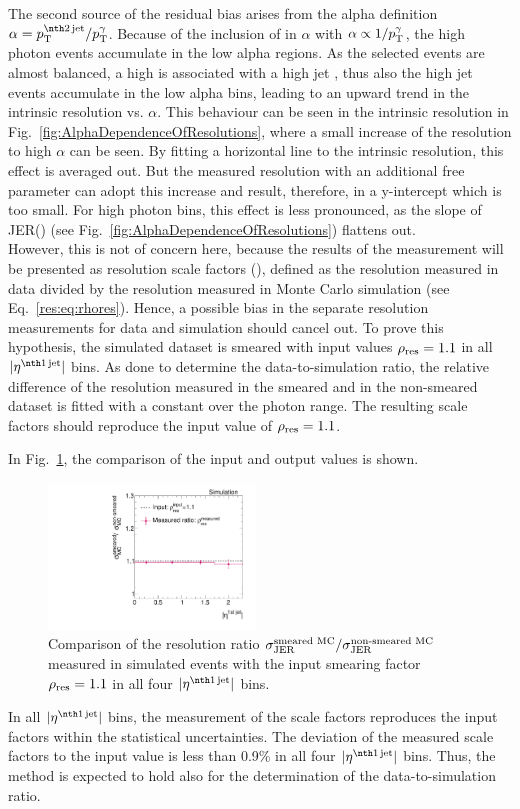 The second source of the residual bias arises from the alpha definition $\alpha = \ptsecondjet/\ptgamma$. 
Because of the inclusion of \ptgamma in $\alpha$ with $\alpha \propto 1/{p}_\mathrm{T}^{\gamma}$, 
the high photon \pt events accumulate in the low alpha regions. 
As the selected events are almost balanced, a high \ptgamma is associated with a high jet \pt, thus also the high jet \pt events accumulate in the low alpha bins, leading to  an upward trend in the intrinsic resolution vs. $\alpha$. 
This behaviour can be seen in the intrinsic resolution in Fig.~\ref{fig:AlphaDependenceOfResolutions}, where a small increase of the resolution to high $\alpha$ can be seen. 
By fitting a horizontal line to the intrinsic resolution, this effect is averaged out. 
But the measured resolution with an additional free parameter can adopt this increase and result, therefore, in a y-intercept which is too small. 
For high photon \pt bins, this effect is less pronounced, as the slope of JER(\ptgamma) (see Fig.~\ref{fig:AlphaDependenceOfResolutions}) flattens out.\\

However, this is not of concern here, because the results of the measurement will be presented as resolution scale factors (\rhores), defined as the resolution measured in data divided by the resolution measured in Monte Carlo simulation (see Eq.~\eqref{res:eq:rhores}). 
Hence, a possible bias in the separate resolution measurements for data and simulation should cancel out. 
To prove this hypothesis, the simulated dataset is smeared with input values $\rho_\mathrm{res} =1.1$ in all $|\etafirstjet|$ bins. 
As done to determine the data-to-simulation ratio, the relative difference of the resolution measured in the smeared and in the non-smeared dataset is fitted with a constant over the photon \pt range.
The resulting scale factors \rhores should reproduce the input value of $\rho_\mathrm{res}=1.1$.

In Fig.~\ref{res:fig:MCClosureRatio}, the comparison of the input and output values is shown. 
\begin{figure}[~t]
  \centering
    \includegraphics[width=0.49\textwidth]{figures/resolution/methodology/MCClosureRatio.pdf}
     \caption{Comparison of the resolution ratio $\sigma_\mathrm{JER}^{\text{smeared MC}}/\sigma_\mathrm{JER}^{\text{non-smeared MC}}$ measured in simulated events with the input smearing factor $\rho_\mathrm{res}=1.1$ in all four $|\etafirstjet|$ bins.}
  \label{res:fig:MCClosureRatio}
\end{figure}
In all $|\etafirstjet|$ bins, the measurement of the scale factors reproduces the input factors within the statistical uncertainties.
The deviation of the measured scale factors to the input value is less than 0.9\% in all four $|\etafirstjet|$ bins.
Thus, the method is expected to hold also for the determination of the data-to-simulation ratio.

